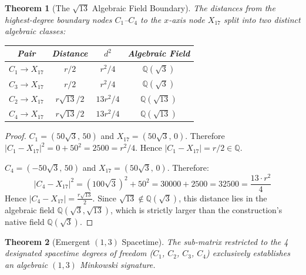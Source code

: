 \documentclass[12pt, a4paper]{article}
\newtheorem{theorem}{Theorem}
\begin{document}
\begin{theorem}[The $\sqrt{13}$ Algebraic Field Boundary]
The distances from the highest-degree boundary nodes $C_1$--$C_4$ to the $x$-axis node $X_{17}$ split into two distinct algebraic classes:

\begin{center}
\begin{tabular}{@{}cccc@{}}
\toprule
\textbf{Pair} & \textbf{Distance} & \textbf{$d^2$} & \textbf{Algebraic Field} \\
\midrule
$C_1 \to X_{17}$ & $r/2$ & $r^2/4$ & $\mathbb{Q}(\sqrt{3})$ \\
$C_3 \to X_{17}$ & $r/2$ & $r^2/4$ & $\mathbb{Q}(\sqrt{3})$ \\
$C_2 \to X_{17}$ & $r\sqrt{13}/2$ & $13r^2/4$ & $\mathbb{Q}(\sqrt{13})$ \\
$C_4 \to X_{17}$ & $r\sqrt{13}/2$ & $13r^2/4$ & $\mathbb{Q}(\sqrt{13})$ \\
\bottomrule
\end{tabular}
\end{center}
\end{theorem}

\begin{proof}
$C_1 = (50\sqrt{3},\, 50)$ and $X_{17} = (50\sqrt{3},\, 0)$. Therefore $|C_1 - X_{17}|^2 = 0 + 50^2 = 2500 = r^2/4$. Hence $|C_1 - X_{17}| = r/2 \in \mathbb{Q}$.

$C_4 = (-50\sqrt{3},\, 50)$ and $X_{17} = (50\sqrt{3},\, 0)$. Therefore:
\[
    |C_4 - X_{17}|^2 = (100\sqrt{3})^2 + 50^2 = 30000 + 2500 = 32500 = \frac{13 \cdot r^2}{4}
\]
Hence $|C_4 - X_{17}| = \frac{r\sqrt{13}}{2}$. Since $\sqrt{13} \notin \mathbb{Q}(\sqrt{3})$, this distance lies in the algebraic field $\mathbb{Q}(\sqrt{3}, \sqrt{13})$, which is strictly larger than the construction's native field $\mathbb{Q}(\sqrt{3})$.
\end{proof}



\begin{theorem}[Emergent $(1,3)$ Spacetime]
The sub-matrix restricted to the 4 designated spacetime degrees of freedom ($C_1$, $C_2$, $C_3$, $C_4$) exclusively establishes an algebraic $(1,3)$ Minkowski signature.
\end{theorem}
\end{document}
